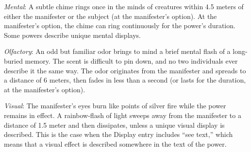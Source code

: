 \textit{Mental}: A subtle chime rings once in the minds of creatures within 4.5 meters of either the manifester or the subject (at the manifester's option). At the manifester's option, the chime can ring continuously for the power's duration. Some powers describe unique mental displays.

\textit{Olfactory}: An odd but familiar odor brings to mind a brief mental flash of a long-buried memory. The scent is difficult to pin down, and no two individuals ever describe it the same way. The odor originates from the manifester and spreads to a distance of 6 meters, then fades in less than a second (or lasts for the duration, at the manifester's option).

\textit{Visual}: The manifester's eyes burn like points of silver fire while the power remains in effect. A rainbow-flash of light sweeps away from the manifester to a distance of 1.5 meter and then dissipates, unless a unique visual display is described. This is the case when the Display entry includes ``see text,'' which means that a visual effect is described somewhere in the text of the power.